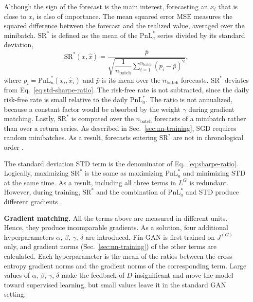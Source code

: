 Although the sign of the forecast is the main interest, forecasting an $\hat{x}_i$ that is close to $x_i$ is also of importance. The mean squared error $\mathrm{MSE}$ measures the squared difference between the forecast and the realized value, averaged over the minibatch. $\mathrm{SR}^{*}$ is defined as the mean of the $\mathrm{PnL}^{*}_{a}$ series divided by its standard deviation,
\begin{equation}
\mathrm{SR}^{*}(x, \hat{x}) = \frac{\bar{p}}{\sqrt{\dfrac{1}{n_{\text{batch}}} \sum_{i=1}^{n_{\text{batch}}} \left( p_i - \bar{p} \right)^{2}}},
\label{eq:sharpe-ratio}
\end{equation}
where $p_i = \mathrm{PnL}^{*}_{a}(x_i, \hat{x}_i)$ and $\bar{p}$ is its mean over the $n_{\mathrm{batch}}$ forecasts. $\mathrm{SR}^{*}$ deviates from Eq.~\eqref{eq:std-sharpe-ratio}. The risk-free rate is not subtracted, since the daily risk-free rate is small relative to the daily $\mathrm{PnL}^*_a$. The ratio is not annualized, because a constant factor would be absorbed by the weight $\gamma$ during gradient matching. Lastly, $\mathrm{SR}^*$ is computed over the $n_{\mathrm{batch}}$ forecasts of a minibatch rather than over a return series. As described in Sec.~\ref{sec:nn-training}, SGD requires random minibatches. As a result, forecasts entering $\mathrm{SR}^*$ are not in chronological order \parencite[11]{vuleticFinGANForecastingClassifying2024}.

The standard deviation $\mathrm{STD}$ term is the denominator of Eq.~\eqref{eq:sharpe-ratio}. Logically, maximizing $\mathrm{SR}^{*}$ is the same as maximizing $\mathrm{PnL}^{*}_{a}$ and minimizing $\mathrm{STD}$ at the same time. As a result, including all three terms in $L^{G}$ is redundant. However, during training, $\mathrm{SR}^{*}$ and the combination of $\mathrm{PnL}^{*}_{a}$ and $\mathrm{STD}$ produce different gradients \parencite{vuleticFinGANForecastingClassifying2024}.

\textbf{Gradient matching.} All the terms above are measured in different units. Hence, they produce incomparable gradients. As a solution, four additional hyperparameters $\alpha$, $\beta$, $\gamma$, $\delta$ are introduced. Fin-GAN is first trained on $J^{(G)}$ only, and gradient norms (Sec.~\ref{sec:nn-training}) of the other terms are calculated. Each hyperparameter is the mean of the ratios between the cross-entropy gradient norms and the gradient norms of the corresponding term.
Large values of $\alpha$, $\beta$, $\gamma$, $\delta$ make the feedback of $D$ insignificant and move the model toward supervised learning, but small values leave it in the standard GAN setting.

